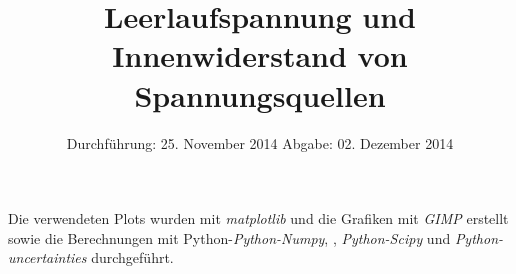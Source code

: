 
\usepackage{marvosym}
\subject{Anfängerpraktikum V301}
\title{Leerlaufspannung und Innenwiderstand von Spannungsquellen
}
\date{
  Durchführung: 25. November 2014
  \hspace{1em}
  Abgabe: 02. Dezember 2014
}


\maketitle
\thispagestyle{empty}
\newpage





\printbibliography
\noindent Die verwendeten Plots wurden mit \textit{matplotlib}\cite{matplotlib} und die Grafiken mit \textit{GIMP}\cite{gimp} erstellt sowie die Berechnungen mit Python-\textit{Python-Numpy}, \cite{numpy}, \textit{Python-Scipy}\cite{scipy} und \textit{Python-uncertainties}\cite{uncertainties} durchgeführt.
